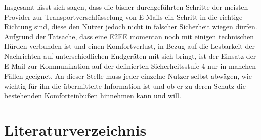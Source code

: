 \documentclass  [paper=a4,
				fontsize=12pt,
				listof=totoc,
				bibliography=totoc
				]{scrreprt}
\begin{document}
{		Insgesamt lässt sich sagen, dass die bisher durchgeführten Schritte der meisten Provider zur Transportverschlüsselung von E-Mails ein Schritt in die richtige Richtung sind, diese den Nutzer jedoch nicht in falscher Sicherheit wiegen dürfen.
		Aufgrund der Tatsache, dass eine \ac{E2EE} momentan noch mit einigen technischen Hürden verbunden ist und einen Komfortverlust, in Bezug auf die Lesbarkeit der Nachrichten auf unterschiedlichen Endgeräten mit sich bringt, ist der Einsatz der E-Mail zur Kommunikation auf der definierten Sicherheitsstufe 4 nur in manchen Fällen geeignet.
		An dieser Stelle muss jeder einzelne Nutzer selbst abwägen, wie wichtig für ihn die übermittelte Information ist und ob er zu deren Schutz die bestehenden Komforteinbußen hinnehmen kann und will.
		
%		
%				
%				
%				
%				
%									
	\chapter*{Literaturverzeichnis}
	\fancyhead{}
	\renewcommand{\headrulewidth}{0pt}	
		\printbibliography[heading=offline,nottype=online]
		\printbibliography[heading=online,type=online]
}
\end{document}
